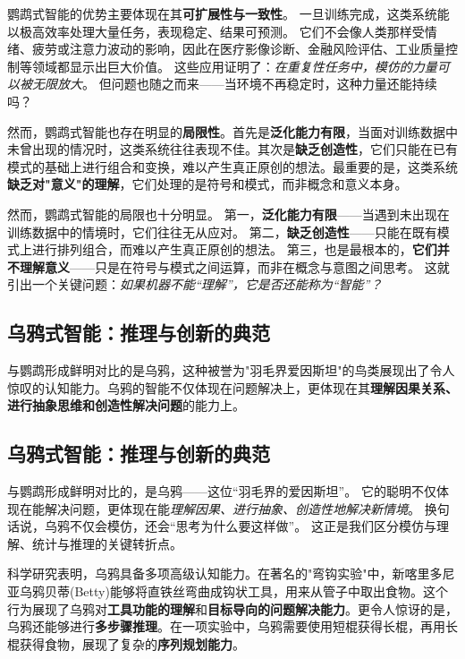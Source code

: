 鹦鹉式智能的优势主要体现在其\textbf{可扩展性与一致性}。
一旦训练完成，这类系统能以极高效率处理大量任务，表现稳定、结果可预测。
它们不会像人类那样受情绪、疲劳或注意力波动的影响，因此在医疗影像诊断、金融风险评估、工业质量控制等领域都显示出巨大价值。
这些应用证明了：\emph{在重复性任务中，模仿的力量可以被无限放大}。
但问题也随之而来——当环境不再稳定时，这种力量还能持续吗？

然而，鹦鹉式智能也存在明显的\textbf{局限性}。首先是\textbf{泛化能力有限}，当面对训练数据中未曾出现的情况时，这类系统往往表现不佳。其次是\textbf{缺乏创造性}，它们只能在已有模式的基础上进行组合和变换，难以产生真正原创的想法。最重要的是，这类系统\textbf{缺乏对"意义"的理解}，它们处理的是符号和模式，而非概念和意义本身。

然而，鹦鹉式智能的局限也十分明显。
第一，\textbf{泛化能力有限}——当遇到未出现在训练数据中的情境时，它们往往无从应对。
第二，\textbf{缺乏创造性}——只能在既有模式上进行排列组合，而难以产生真正原创的想法。
第三，也是最根本的，\textbf{它们并不理解意义}——只是在符号与模式之间运算，而非在概念与意图之间思考。
这就引出一个关键问题：\emph{如果机器不能“理解”，它是否还能称为“智能”？}

\subsection{乌鸦式智能：推理与创新的典范}

与鹦鹉形成鲜明对比的是乌鸦，这种被誉为"羽毛界爱因斯坦"的鸟类展现出了令人惊叹的认知能力。乌鸦的智能不仅体现在问题解决上，更体现在其\textbf{理解因果关系、进行抽象思维和创造性解决问题}的能力上。

\subsection{乌鸦式智能：推理与创新的典范}

与鹦鹉形成鲜明对比的，是乌鸦——这位“羽毛界的爱因斯坦”。
它的聪明不仅体现在能解决问题，更体现在能\emph{理解因果、进行抽象、创造性地解决新情境}。
换句话说，乌鸦不仅会模仿，还会“思考为什么要这样做”。
这正是我们区分模仿与理解、统计与推理的关键转折点。


科学研究表明，乌鸦具备多项高级认知能力。在著名的"弯钩实验"中，新喀里多尼亚乌鸦贝蒂(Betty)能够将直铁丝弯曲成钩状工具，用来从管子中取出食物。这个行为展现了乌鸦对\textbf{工具功能的理解}和\textbf{目标导向的问题解决能力}。更令人惊讶的是，乌鸦还能够进行\textbf{多步骤推理}。在一项实验中，乌鸦需要使用短棍获得长棍，再用长棍获得食物，展现了复杂的\textbf{序列规划能力}。


